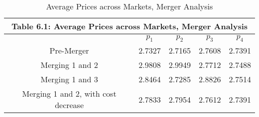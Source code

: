 
\begin{table}
\centering
\begin{tabular}{ |c|c|c|c|c|}
 \hline
\multicolumn{5}{|c|}{Table 6.1: Average Prices across Markets, Merger Analysis}
 \\
 \hline
 & $p_1$ & $p_2$ & $p_3$ & $p_4$ \\
 \hline
 Pre-Merger & 2.7327 & 2.7165  & 2.7608 & 2.7391 \\
 \hline
 Merging 1 and 2 & 2.9808 & 2.9949 & 2.7712 & 2.7488 \\
 \hline
 Merging 1 and 3 & 2.8464 & 2.7285 & 2.8826 & 2.7514\\
 \hline
 Merging 1 and 2, with cost decrease & 2.7833 & 2.7954 & 2.7612 & 2.7391\\
 \hline
\end{tabular}
\label{table6_1}
\caption{Average Prices across Markets, Merger Analysis}
\end{table}
